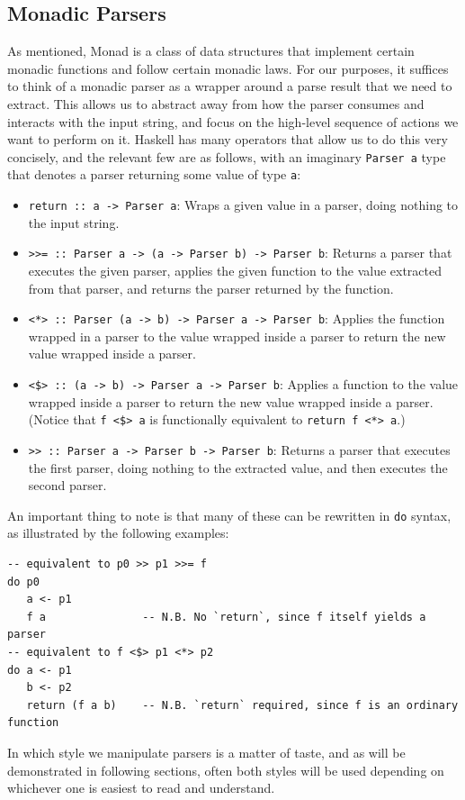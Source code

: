 \documentclass[format=acmlarge, review=false, nonacm=false, screen=true]{acmart}
\begin{document}
\subsection{Monadic Parsers}
As mentioned, Monad is a class of data structures that implement certain monadic functions and follow certain monadic laws. For our purposes, it suffices to think of a monadic parser as a wrapper around a parse result that we need to extract. This allows us to abstract away from how the parser consumes and interacts with the input string, and focus on the high-level sequence of actions we want to perform on it. Haskell has many operators that allow us to do this very concisely, and the relevant few are as follows, with an imaginary \texttt{Parser a} type that denotes a parser returning some value of type \texttt{a}:
    \begin{itemize}
        \item \texttt{return :: a -> Parser a}: Wraps a given value in a parser, doing nothing to the input string.
        \item \texttt{>>= :: Parser a -> (a -> Parser b) -> Parser b}: Returns a parser that executes the given parser, applies the given function to the value extracted from that parser, and returns the parser returned by the function.
        \item \texttt{<*> :: Parser (a -> b) -> Parser a -> Parser b}: Applies the function wrapped in a parser to the value wrapped inside a parser to return the new value wrapped inside a parser.
        \item \texttt{<\$> :: (a -> b) -> Parser a -> Parser b}: Applies a function to the value wrapped inside a parser to return the new value wrapped inside a parser. (Notice that \texttt{f <\$> a} is functionally equivalent to \texttt{return f <*> a}.)
        \item \texttt{>> :: Parser a -> Parser b -> Parser b}: Returns a parser that executes the first parser, doing nothing to the extracted value, and then executes the second parser.
    \end{itemize}
An important thing to note is that many of these can be rewritten in \texttt{do} syntax, as illustrated by the following examples:
\begin{verbatim}
-- equivalent to p0 >> p1 >>= f
do p0
   a <- p1
   f a               -- N.B. No `return`, since f itself yields a parser
-- equivalent to f <$> p1 <*> p2
do a <- p1
   b <- p2
   return (f a b)    -- N.B. `return` required, since f is an ordinary function
\end{verbatim}
In which style we manipulate parsers is a matter of taste, and as will be demonstrated in following sections, often both styles will be used depending on whichever one is easiest to read and understand.
\end{document}
